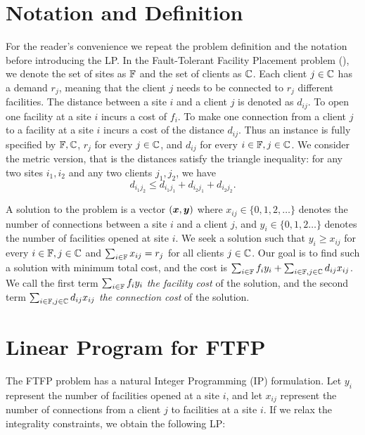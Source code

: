 \documentclass[oneside,final]{ucr}
\begin{document}
\section{Notation and Definition}
For the reader's convenience we repeat the problem
definition and the notation before introducing the LP. In
the Fault-Tolerant Facility Placement problem ({\FTFP}), we
denote the set of sites as $\mathbb{F}$ and the set of
clients as $\mathbb{C}$. Each client $j \in \mathbb{C}$ has
a demand $r_j$, meaning that the client $j$ needs to be
connected to $r_j$ different facilities. The distance
between a site $i$ and a client $j$ is denoted as
$d_{ij}$. To open one facility at a site $i$ incurs a cost
of $f_i$. To make one connection from a client $j$ to a
facility at a site $i$ incurs a cost of the distance
$d_{ij}$. Thus an {\FTFP} instance is fully specified by
$\mathbb{F}, \mathbb{C}$, $r_j$ for every $j\in\mathbb{C}$,
and $d_{ij}$ for every $i\in\mathbb{F},j\in\mathbb{C}$. We
consider the metric version, that is the distances satisfy
the triangle inequality: for any two sites $i_1,i_2$ and any
two clients $j_1,j_2$, we have
\begin{equation*}
  d_{i_1 j_2} \leq d_{i_1 j_1} + d_{i_2 j_1} + d_{i_2 j_2}.
\end{equation*} 

A solution to the {\FTFP} problem is a vector $(\boldsymbol{x}, \boldsymbol{y})$
where $x_{ij} \in \{0, 1, 2, \ldots\}$ denotes the number of
connections between a site $i$ and a client $j$, and $y_i
\in \{0, 1, 2\ldots\}$ denotes the number of facilities
opened at site $i$. We seek a solution such that $y_i \geq
x_{ij}$ for every $i \in \mathbb{F}, j \in \mathbb{C}$ and
$\sum_{i\in\mathbb{F}} x_{ij} = r_j$ for all clients $j \in
\mathbb{C}$. Our goal is to find such a solution with
minimum total cost, and the cost is $\sum_{i \in \mathbb{F}}
f_i y_i + \sum_{i \in \mathbb{F}, j \in \mathbb{C}} d_{ij}
x_{ij}$. We call the first term $\sum_{i \in \mathbb{F}} f_i
y_i$ \emph{the facility cost} of the solution, and the
second term $\sum_{i \in \mathbb{F}, j \in \mathbb{C}} d_{ij}
x_{ij}$ \emph{the connection cost} of the solution.

\section{Linear Program for FTFP}
The FTFP problem has a natural Integer Programming (IP)
formulation. Let $y_i$ represent the number of facilities
opened at a site $i$, and let $x_{ij}$ represent the number
of connections from a client $j$ to facilities at a site
$i$. If we relax the integrality constraints, we obtain the
following LP:
\end{document}
